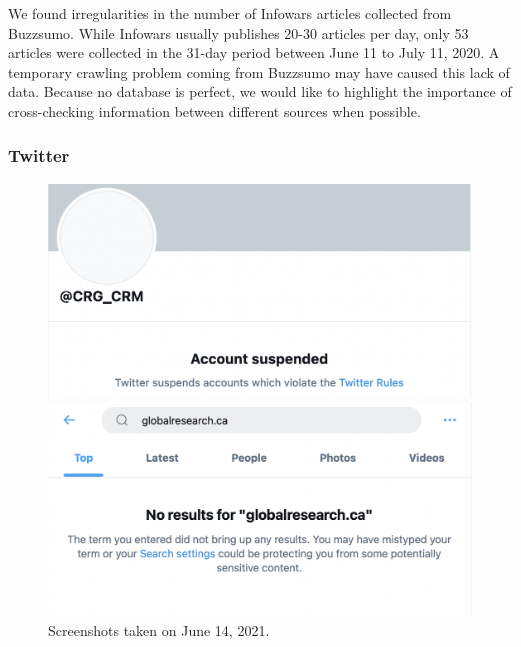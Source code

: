 \documentclass[11pt,a4paper]{article}
\begin{document}
We found irregularities in the number of Infowars articles collected from Buzzsumo. While Infowars usually publishes 20-30 articles per day, only 53 articles were collected in the 31-day period between June 11 to July 11, 2020. A temporary crawling problem coming from Buzzsumo may have caused this lack of data. Because no database is perfect, we would like to highlight the importance of cross-checking information between different sources when possible.





\subsubsection{Twitter} 

\begin{figure}
	\centering
		\begin{multicols}{1}	
			\includegraphics[scale=0.3]{./img/globalresearch_2021-06-14.png}
		\end{multicols}
		
		\begin{multicols}{1}
			\includegraphics[scale=0.3]{./img/globalresearch_14_06_2021_16pm_UTC.png} 
		\end{multicols}
		\caption{Screenshots taken on June 14, 2021. }
		\label{fig3}
\end{figure}
\end{document}
